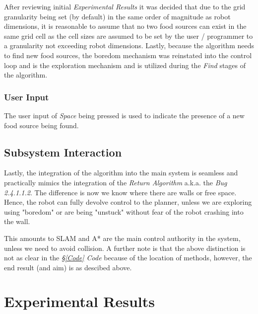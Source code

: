 \documentclass[11pt, a4paper]{article}
\begin{document}
After reviewing initial \textit{Experimental Results} it was decided 
that due to the grid granularity being set (by default) in the same order of magnitude as robot 
dimensions, it is reasonable to assume that no two food sources can exist in the same grid cell 
as the cell sizes are assumed to be set by the user / programmer to a granularity not exceeding 
robot dimensions. Lastly, because the algorithm needs to find new food sources, the boredom 
mechanism \cite{task1_report} was reinstated into the control loop and is the exploration 
mechanism and is utilized during the \textit{Find} stages of the algorithm.




\subsubsection{User Input}
\label{Planner_User_Input}

The user input of \textit{Space} being pressed is used to indicate the presence of a new food 
source being found. 

\subsection{Subsystem Interaction}

Lastly, the integration of the algorithm into the main system is seamless and practically mimics 
the integration of the \textit{Return Algorithm} \cite{task2_report} a.k.a. the \textit{Bug 2.4.1.1.2}. 
The difference is now we know where there are walls or free space. Hence, the robot can fully 
devolve control to the planner, unless we are exploring using "boredom" \cite{task2_report} or 
are being "unstuck" \cite{task2_report} without fear of the robot crashing into the wall. 

This amounts to SLAM and A* are the main control authority in the system, unless we need 
to avoid collision. A further note is that the above distinction is not as clear in the 
\textit{\S\ref{Code} Code} because of the location of methods, however, the end result 
(and aim) is as descibed above.




\section{Experimental Results}
\label{Experimental_Results}
\end{document}
